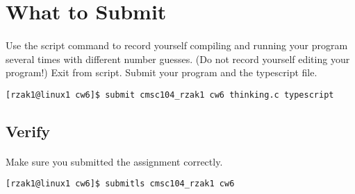 \documentclass[letter,11pt]{article}
\begin{document}
\section*{What to Submit}
\paragraph{}Use the script command to record yourself compiling and running your program several times with different number guesses. (Do not record yourself editing your program!) Exit from script. Submit your program and the typescript file.
\begin{verbatim}
[rzak1@linux1 cw6]$ submit cmsc104_rzak1 cw6 thinking.c typescript
\end{verbatim}

\subsection*{Verify}
\paragraph{}Make sure you submitted the assignment correctly.
\begin{verbatim}
[rzak1@linux1 cw6]$ submitls cmsc104_rzak1 cw6
\end{verbatim}
\end{document}
